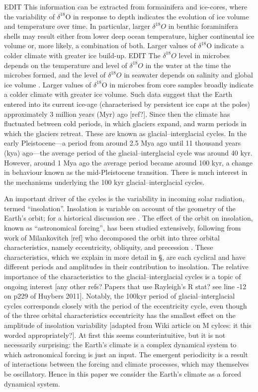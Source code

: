 \documentclass[a4paper,12pt]{article}
\begin{document}
EDIT This information can be extracted from formainifera and ice-cores, where the
variability of $\delta^{18}$O in response to depth indicates the evolution of ice volume and temperature over time.  In
particular, larger $\delta^{18}O$ in benthic foraminifera shells may result either from lower deep ocean temperature,
higher continental ice volume or, more likely, a combination of both.  Larger values of $\delta^{18}$O indicate a
colder climate with greater ice build-up.
EDIT 
The $\delta^{18}O$ level in microbes depends on the temperature and
level of $\delta^{18}O$ in the water at the time the microbes formed, and the level of 
$\delta^{18}O$ in seawater depends on salinity and global ice volume \cite{Lisiecki2005}.  
Larger values of $\delta^{18}$O in microbes from 
core samples broadly indicate a colder climate with greater ice volume.
Such data suggest that the Earth entered into its current ice-age (characterised by
persistent ice caps at the poles) approximately 3 million years (Myr) ago [ref?].  Since
then the climate has fluctuated between cold periods, in which glaciers expand, and warm
periods in which the glaciers retreat.  These are known as glacial--interglacial cycles.  In
the early Pleistocene---a period from around 2.5 Mya ago until 11 thousand years (kya)
ago---the average period of the glacial--interglacial cycle was around 40 kyr.  However,
around 1 Mya ago the average period became around 100 kyr, a change in behaviour known as
the mid-Pleistocene transition. There is much interest in the mechanisms underlying the
100 kyr glacial--interglacial cycles.


An important driver of the cycles is the variability in incoming solar
radiation, termed ``insolation''.  Insolation is variable on account of the geometry of the
Earth's orbit; for a historical discussion see \cite{Berger2004}.  The effect of the orbit
on insolation, known as ``astronomical forcing'', has been studied extensively, following
from work of Milankovitch [ref] who decomposed the orbit into three orbital characteristics,
namely eccentricity, obliquity, and precession \cite{Hays1976}.  These characteristics,
which we explain in more detail in \S, are each cyclical and have different periods and
amplitudes in their contribution to insolation.  The relative importance of the
characteristics to the glacial--interglacial cycles is a topic of ongoing interest
\cite{Huybers2005,Lisiecki2010,Huybers2011} [any other refs?  Papers that use Rayleigh's R
stat? see line -12 on p229 of Huybers 2011].  Notably, the 100kyr period of
glacial--interglacial cycles corresponds closely with the period of the eccentricity cycle,
even though of the three orbital characteristics eccentricity has the smallest effect on the
amplitude of insolation variability [adapted from Wiki article on M cylces: it this worded
appropriately?].  At first this seems counterintuitive, but it is not necessarily
surprising: the Earth's climate is a complex dynamical system to which astronomical forcing
is just an input.  The emergent periodicity is a result of interactions between the forcing
and climate processes, which may themselves be oscillatory.
Hence in this paper we consider the Earth's climate as a forced dynamical system.  
\end{document}
